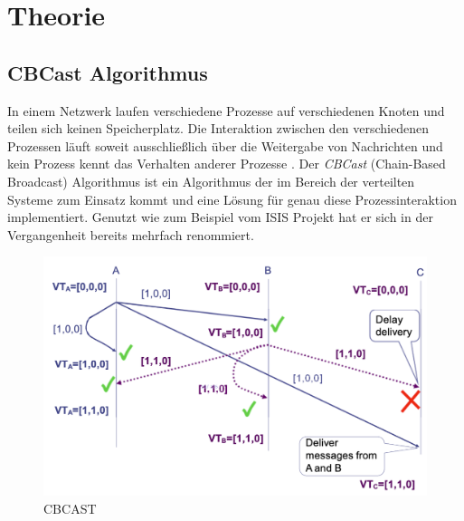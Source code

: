 \section{Theorie}

\subsection{CBCast Algorithmus}

In einem Netzwerk laufen verschiedene Prozesse auf verschiedenen Knoten und teilen sich keinen Speicherplatz. Die Interaktion zwischen den verschiedenen Prozessen läuft soweit ausschließlich über die Weitergabe von Nachrichten und kein Prozess kennt das Verhalten anderer Prozesse \cite{CBCAST_1}. Der \textit{CBCast} (Chain-Based Broadcast) Algorithmus ist ein Algorithmus der im Bereich der verteilten Systeme zum Einsatz kommt und eine Lösung für genau diese Prozessinteraktion implementiert. Genutzt wie zum Beispiel vom ISIS Projekt \cite{isis_project} hat er sich in der Vergangenheit bereits mehrfach renommiert.

\begin{figure}[htbp]
\begin{center}
\includegraphics[scale=0.4]{Latex/Bilder/cbcast_1.png}
\caption{\label{fig:cbcastFunction} CBCAST \cite{Aufgabenstellung}} 
\end{center}
\end{figure}

